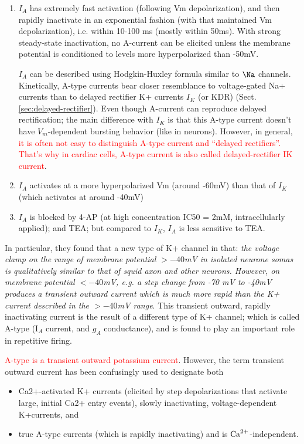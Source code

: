 \begin{enumerate}

  \item $I_A$ has extremely fast activation (following Vm depolarization), and
  then rapidly inactivate in an exponential fashion (with that maintained Vm
  depolarization), i.e. within 10-100 ms (mostly within 50ms).
  With strong steady-state inactivation, no A-current can be elicited unless the
  membrane potential is conditioned to levels more hyperpolarized than -50mV.
  
 $I_A$ can be described using Hodgkin-Huxley formula  similar to $\Na$ channels.
 Kinetically, A-type currents bear closer resemblance to voltage-gated Na+
 currents than to delayed rectifier K+ currents $I_K$ (or KDR)
 (Sect.\ref{sec:delayed-rectifier}). Even though A-current can reproduce delayed
rectification; the main difference with $I_K$ is that this A-type current
doesn't have $V_m$-dependent bursting behavior (like in neurons). However, in
general, \textcolor{red}{it is often not easy to distinguish A-type current and
``delayed rectifiers''. That's why in cardiac cells, A-type current is also
called delayed-rectifier IK current}.
  
  \item $I_A$ activates at a more hyperpolarized Vm (around -60mV) than that of
  $I_K$ (which activates at around -40mV)
  
  \item $I_A$ is blocked by 4-AP (at high concentration IC50 = 2mM,
  intracellularly applied); and TEA; but compared to $I_K$, $I_A$ is less
  sensitive to TEA.
\end{enumerate}

In particular, they found that a new type of K+ channel in that: {\it the
voltage clamp on the range of membrane potential $> -40$mV in isolated neurone
somas is qualitatively similar to that of squid axon and other neurons. However,
on membrane potential $< -40$mV, e.g.
a step change from -70 mV to -40mV produces a transient outward current which is
much more rapid than the K+ current described in the $> -40$mV range}. This
transient outward, rapidly inactivating current is the result of a different
type of K+ channel; which is called A-type (I$_A$ current, and $g_A$
conductance), and is found to play an important role in repetitive firing.

\textcolor{red}{A-type is a transient outward potassium current}. However, the
term transient outward current has been confusingly used to designate both
\begin{itemize}
  \item  Ca2+-activated K+ currents (elicited by step depolarizations that
  activate large, initial Ca2+ entry events), slowly inactivating,
  voltage-dependent K+currents, and  

  \item true A-type currents (which is rapidly inactivating) and is
  ${\text{Ca}^{2+}}$-independent.
\end{itemize}


